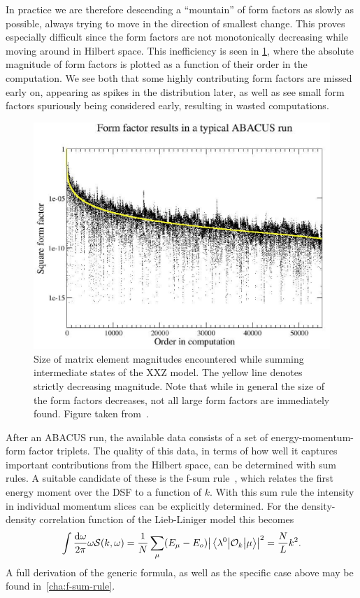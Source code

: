 \documentclass[11pt, a4paper]{report} %
\begin{document}
In practice we are therefore descending a ``mountain'' of form factors as slowly as possible, always trying to move in the direction of smallest change.
This proves especially difficult since the form factors are not monotonically decreasing while moving around in Hilbert space.
This inefficiency is seen in \cref{fig:orderedmagnitudes}, where the absolute magnitude of form factors is plotted as a function of their order in the computation.
We see both that some highly contributing form factors are missed early on, appearing as spikes in the distribution later, as well as see small form factors spuriously being considered early, resulting in wasted computations.
\begin{figure}[tb!]
  \centering
  \includegraphics[width=\textwidth]{FFsq_vs_order_D0p6N50M20_small}
  \caption{Size of matrix element magnitudes encountered while summing intermediate states of the XXZ model. The yellow line denotes strictly decreasing magnitude. Note that while in general the size of the form factors decreases, not all large form factors are immediately found. Figure taken from~\cite{Caux2009}.}
  \label{fig:orderedmagnitudes}
\end{figure}

After an ABACUS run, the available data consists of a set of energy-momentum-form factor triplets.
The quality of this data, in terms of how well it captures important contributions from the Hilbert space, can be determined with sum rules.
A suitable candidate of these is the f-sum rule~\cite{Caux2007a}, which relates the first energy moment over the DSF to a function of \(k\).
With this sum rule the intensity in individual momentum slices can be explicitly determined.
For the density-density correlation function of the Lieb-Liniger model this becomes
\begin{align}
  \int \frac{\dd \omega}{2\pi} \omega \mathcal{S}(k, \omega) = \frac{1}{N}\sum_{\mu}(E_{\mu}-E_o)\abs{\mel{\lambda^0}{\mathcal{O}_k}{\mu}}^2  = \frac{N}{L} k^2.
\end{align}
A full derivation of the generic formula, as well as the specific case above may be found in~\cref{cha:f-sum-rule}. 
\end{document}
